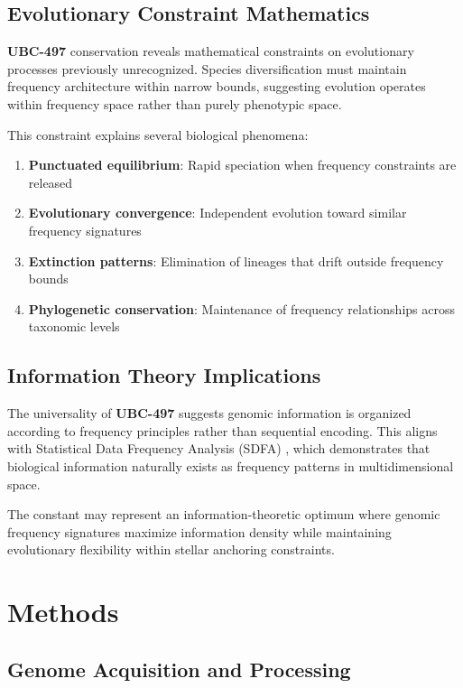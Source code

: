 \documentclass[9pt,twocolumn,twoside,lineno]{pnas-new}
\newcommand{\UBC}[1]{\textbf{UBC-#1}}
\begin{document}
\subsection*{Evolutionary Constraint Mathematics}

\UBC{497} conservation reveals mathematical constraints on evolutionary processes previously unrecognized. Species diversification must maintain frequency architecture within narrow bounds, suggesting evolution operates within frequency space rather than purely phenotypic space.

This constraint explains several biological phenomena:
\begin{enumerate}
\item \textbf{Punctuated equilibrium}: Rapid speciation when frequency constraints are released
\item \textbf{Evolutionary convergence}: Independent evolution toward similar frequency signatures
\item \textbf{Extinction patterns}: Elimination of lineages that drift outside frequency bounds
\item \textbf{Phylogenetic conservation}: Maintenance of frequency relationships across taxonomic levels
\end{enumerate}

\subsection*{Information Theory Implications}

The universality of \UBC{497} suggests genomic information is organized according to frequency principles rather than sequential encoding. This aligns with Statistical Data Frequency Analysis (SDFA) \cite{russell_sdfa_2025}, which demonstrates that biological information naturally exists as frequency patterns in multidimensional space.

The constant may represent an information-theoretic optimum where genomic frequency signatures maximize information density while maintaining evolutionary flexibility within stellar anchoring constraints.

\section*{Methods}

\subsection*{Genome Acquisition and Processing}
\end{document}
